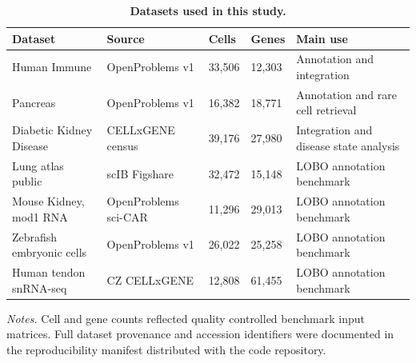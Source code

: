 \documentclass[11pt]{article}
\begin{document}
\begin{table}[htbp]
\centering
\caption{\textbf{Datasets used in this study.}}
\label{tab:s1_datasets}
\scriptsize
\begin{tabularx}{\textwidth}{@{}L{0.22\textwidth} L{0.20\textwidth} L{0.12\textwidth} L{0.12\textwidth} Y@{}}
\toprule
Dataset & Source & Cells & Genes & Main use \\
\midrule
Human Immune & OpenProblems v1 & 33,506 & 12,303 & Annotation and integration \\
Pancreas & OpenProblems v1 & 16,382 & 18,771 & Annotation and rare cell retrieval \\
Diabetic Kidney Disease & CELLxGENE census & 39,176 & 27,980 & Integration and disease state analysis \\
Lung atlas public & scIB Figshare & 32,472 & 15,148 & LOBO annotation benchmark \\
Mouse Kidney, mod1 RNA & OpenProblems sci-CAR & 11,296 & 29,013 & LOBO annotation benchmark \\
Zebrafish embryonic cells & OpenProblems v1 & 26,022 & 25,258 & LOBO annotation benchmark \\
Human tendon snRNA-seq & CZ CELLxGENE & 12,808 & 61,455 & LOBO annotation benchmark \\
\bottomrule
\end{tabularx}

\vspace{0.5em}
{\raggedright\scriptsize\textit{Notes.} Cell and gene counts reflected quality controlled benchmark input matrices. Full dataset provenance and accession identifiers were documented in the reproducibility manifest distributed with the code repository.\par}
\end{table}

\FloatBarrier
\end{document}
